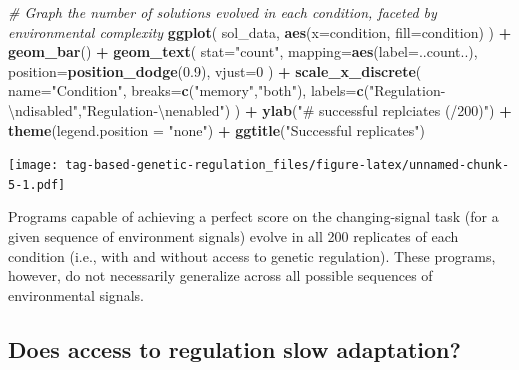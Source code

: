 \documentclass[
]{book}
\newenvironment{Shaded}{\begin{snugshade}}{\end{snugshade}}
\newcommand{\CharTok}[1]{\textcolor[rgb]{0.31,0.60,0.02}{#1}}
\newcommand{\CommentTok}[1]{\textcolor[rgb]{0.56,0.35,0.01}{\textit{#1}}}
\newcommand{\DataTypeTok}[1]{\textcolor[rgb]{0.13,0.29,0.53}{#1}}
\newcommand{\DecValTok}[1]{\textcolor[rgb]{0.00,0.00,0.81}{#1}}
\newcommand{\FloatTok}[1]{\textcolor[rgb]{0.00,0.00,0.81}{#1}}
\newcommand{\KeywordTok}[1]{\textcolor[rgb]{0.13,0.29,0.53}{\textbf{#1}}}
\newcommand{\NormalTok}[1]{#1}
\newcommand{\OperatorTok}[1]{\textcolor[rgb]{0.81,0.36,0.00}{\textbf{#1}}}
\newcommand{\StringTok}[1]{\textcolor[rgb]{0.31,0.60,0.02}{#1}}
\begin{document}
\begin{Shaded}
\begin{Highlighting}[]
\CommentTok{\# Graph the number of solutions evolved in each condition, faceted by environmental complexity}
\KeywordTok{ggplot}\NormalTok{( sol\_data, }\KeywordTok{aes}\NormalTok{(}\DataTypeTok{x=}\NormalTok{condition, }\DataTypeTok{fill=}\NormalTok{condition) ) }\OperatorTok{+}
\StringTok{  }\KeywordTok{geom\_bar}\NormalTok{() }\OperatorTok{+}
\StringTok{  }\KeywordTok{geom\_text}\NormalTok{(}
    \DataTypeTok{stat=}\StringTok{"count"}\NormalTok{,}
    \DataTypeTok{mapping=}\KeywordTok{aes}\NormalTok{(}\DataTypeTok{label=}\NormalTok{..count..),}
    \DataTypeTok{position=}\KeywordTok{position\_dodge}\NormalTok{(}\FloatTok{0.9}\NormalTok{),}
    \DataTypeTok{vjust=}\DecValTok{0}
\NormalTok{  ) }\OperatorTok{+}
\StringTok{  }\KeywordTok{scale\_x\_discrete}\NormalTok{(}
    \DataTypeTok{name=}\StringTok{"Condition"}\NormalTok{,}
    \DataTypeTok{breaks=}\KeywordTok{c}\NormalTok{(}\StringTok{"memory"}\NormalTok{,}\StringTok{"both"}\NormalTok{),}
    \DataTypeTok{labels=}\KeywordTok{c}\NormalTok{(}\StringTok{"Regulation{-}}\CharTok{\textbackslash{}n}\StringTok{disabled"}\NormalTok{,}\StringTok{"Regulation{-}}\CharTok{\textbackslash{}n}\StringTok{enabled"}\NormalTok{)}
\NormalTok{  ) }\OperatorTok{+}
\StringTok{  }\KeywordTok{ylab}\NormalTok{(}\StringTok{"\# successful replciates (/200)"}\NormalTok{) }\OperatorTok{+}
\StringTok{  }\KeywordTok{theme}\NormalTok{(}\DataTypeTok{legend.position =} \StringTok{"none"}\NormalTok{) }\OperatorTok{+}
\StringTok{  }\KeywordTok{ggtitle}\NormalTok{(}\StringTok{"Successful replicates"}\NormalTok{)}
\end{Highlighting}
\end{Shaded}

\texttt{[image: tag-based-genetic-regulation\_files/figure-latex/unnamed-chunk-5-1.pdf]}

Programs capable of achieving a perfect score on the changing-signal task (for a given sequence of environment signals) evolve in all 200 replicates of each condition (i.e., with and without access to genetic regulation).
These programs, however, do not necessarily generalize across all possible sequences of environmental signals.

\hypertarget{does-access-to-regulation-slow-adaptation}{%
\subsection{Does access to regulation slow adaptation?}\label{does-access-to-regulation-slow-adaptation}}
\end{document}
